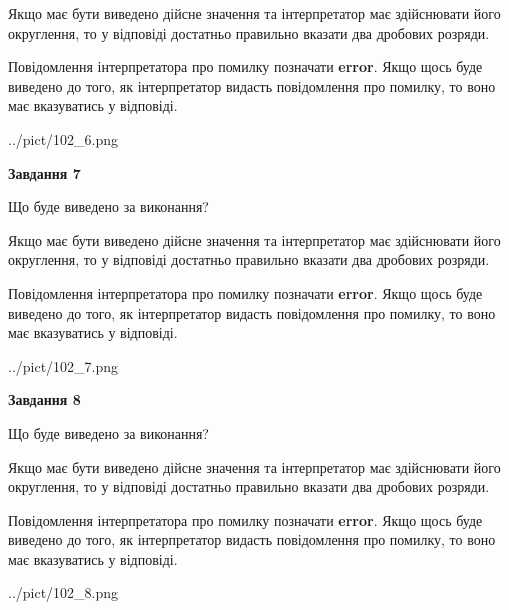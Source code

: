 \documentclass[12pt, ukrainian]{article}
\begin{document}
{\begin {Large}
Якщо має бути виведено дійсне значення та інтерпретатор має здійснювати його округлення, 
то у відповіді достатньо правильно вказати два дробових розряди.

Повідомлення інтерпретатора про помилку позначати \textbf{error}.
Якщо щось буде виведено до того, як інтерпретатор видасть повідомлення про помилку, 
то воно має вказуватись у відповіді. \par

\begin{center}
	{../pict/102_6.png}
\end{center}
\newpage

{\begin {center}\textbf{Завдання 7}\end {center}}\par
Що буде виведено за виконання? \par

Якщо має бути виведено дійсне значення та інтерпретатор має здійснювати його округлення, 
то у відповіді достатньо правильно вказати два дробових розряди.

Повідомлення інтерпретатора про помилку позначати \textbf{error}.
Якщо щось буде виведено до того, як інтерпретатор видасть повідомлення про помилку, 
то воно має вказуватись у відповіді. \par

\begin{center}
	{../pict/102_7.png}
\end{center}
\newpage

{\begin {center}\textbf{Завдання 8}\end {center}}\par
Що буде виведено за виконання? \par

Якщо має бути виведено дійсне значення та інтерпретатор має здійснювати його округлення, 
то у відповіді достатньо правильно вказати два дробових розряди.

Повідомлення інтерпретатора про помилку позначати \textbf{error}.
Якщо щось буде виведено до того, як інтерпретатор видасть повідомлення про помилку, 
то воно має вказуватись у відповіді. \par

\begin{center}
	{../pict/102_8.png}
\end{center}
\newpage


\end{Large}}
\end{document}
